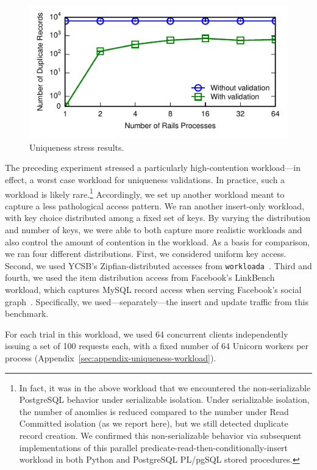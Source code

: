 \begin{figure}
\includegraphics[width=\columnwidth]{figs/pk_stress_violations.pdf}
\caption{Uniqueness stress results.}
\label{fig:pk-stress}
\end{figure} 

 The preceding experiment stressed a
particularly high-contention workload---in effect, a worst case
workload for uniqueness validations. In practice, such a workload is
likely rare.\footnote{In fact, it was in the above workload that we
  encountered the non-serializable PostgreSQL behavior under
  serializable isolation. Under serializable isolation, the number of
  anomlies is reduced compared to the number under Read Committed
  isolation (as we report here), but we still detected duplicate
  record creation. We confirmed this non-serializable behavior via
  subsequent implementations of this parallel
  predicate-read-then-conditionally-insert workload in both Python and
  PostgreSQL PL/pgSQL stored procedures.} Accordingly, we set up
another workload meant to capture a less pathological access
pattern. We ran another insert-only workload, with key choice
distributed among a fixed set of keys. By varying the distribution and
number of keys, we were able to both capture more realistic workloads
and also control the amount of contention in the workload. As a basis
for comparison, we ran four different distributions. First, we
considered uniform key access. Second, we used YCSB's
Zipfian-distributed accesses from
\texttt{workloada}~\cite{ycsb}. Third and fourth, we used the item
distribution access from Facebook's LinkBench workload, which captures
MySQL record access when serving Facebook's social
graph~\cite{linkbench}. Specifically, we used---separately---the
insert and update traffic from this benchmark.

For each trial in this workload, we used 64 concurrent clients
independently issuing a set of 100 requests each, with a fixed number
of 64 Unicorn workers per process (Appendix~\ref{sec:appendix-uniqueness-workload}). 

